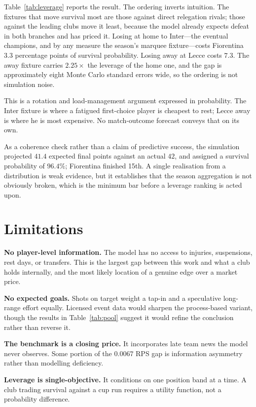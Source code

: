 \documentclass[11pt]{article}
\begin{document}
Table~\ref{tab:leverage} reports the result. The ordering inverts intuition. The
fixtures that move survival most are those against direct relegation rivals;
those against the leading clubs move it least, because the model already expects
defeat in both branches and has priced it. Losing at home to Inter---the
eventual champions, and by any measure the season's marquee fixture---costs
Fiorentina $3.3$ percentage points of survival probability. Losing away at Lecce
costs $7.3$. The away fixture carries $2.25\times$ the leverage of the home one,
and the gap is approximately eight Monte Carlo standard errors wide, so the
ordering is not simulation noise.

This is a rotation and load-management argument expressed in probability. The
Inter fixture is where a fatigued first-choice player is cheapest to rest; Lecce
away is where he is most expensive. No match-outcome forecast conveys that on
its own.

As a coherence check rather than a claim of predictive success, the simulation
projected $41.4$ expected final points against an actual $42$, and assigned a
survival probability of $96.4\%$; Fiorentina finished 15th. A single realisation
from a distribution is weak evidence, but it establishes that the season
aggregation is not obviously broken, which is the minimum bar before a leverage
ranking is acted upon.

\section{Limitations}
\label{sec:limits}

\textbf{No player-level information.} The model has no access to injuries,
suspensions, rest days, or transfers. This is the largest gap between this work
and what a club holds internally, and the most likely location of a genuine edge
over a market price.

\textbf{No expected goals.} Shots on target weight a tap-in and a speculative
long-range effort equally. Licensed event data would sharpen the process-based
variant, though the results in Table~\ref{tab:pool} suggest it would refine the
conclusion rather than reverse it.

\textbf{The benchmark is a closing price.} It incorporates late team news the
model never observes. Some portion of the $0.0067$ RPS gap is information
asymmetry rather than modelling deficiency.

\textbf{Leverage is single-objective.} It conditions on one position band at a
time. A club trading survival against a cup run requires a utility function, not
a probability difference.
\end{document}
